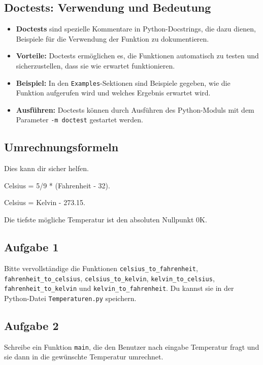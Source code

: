 \documentclass{article}
\begin{document}
\subsection*{Doctests: Verwendung und Bedeutung}

\begin{itemize}
    \item \textbf{Doctests} sind spezielle Kommentare in Python-Docstrings, die dazu dienen, Beispiele für die Verwendung der Funktion zu dokumentieren.
    \item \textbf{Vorteile:} Doctests ermöglichen es, die Funktionen automatisch zu testen und sicherzustellen, dass sie wie erwartet funktionieren.
    \item \textbf{Beispiel:} In den \texttt{Examples}-Sektionen sind Beispiele gegeben, wie die Funktion aufgerufen wird und welches Ergebnis erwartet wird.
    \item \textbf{Ausführen:} Doctests können durch Ausführen des Python-Moduls mit dem Parameter \texttt{-m doctest} gestartet werden.
\end{itemize}

\subsection*{Umrechnungsformeln}
\begin{tcolorbox}[colback=red!5!white,colframe=red!75!black]
    Dies kann dir sicher helfen.

    Celsius = 5/9 * (Fahrenheit - 32).

    Celsius = Kelvin - 273.15.

    Die tiefste mögliche Temperatur ist den absoluten Nullpunkt 0K.

  \end{tcolorbox}

\subsection*{Aufgabe 1}
Bitte vervollständige die Funktionen \texttt{celsius\_to\_fahrenheit}, \texttt{fahrenheit\_to\_celsius}, \texttt{celsius\_to\_kelvin}, \texttt{kelvin\_to\_celsius}, \texttt{fahrenheit\_to\_kelvin} und \texttt{kelvin\_to\_fahrenheit}.
Du kannst sie in der Python-Datei \texttt{Temperaturen.py} speichern.
\subsection*{Aufgabe 2}
Schreibe ein Funktion \texttt{main}, die den Benutzer nach eingabe Temperatur fragt und sie dann in die gewünschte Temperatur umrechnet.
\end{document}
